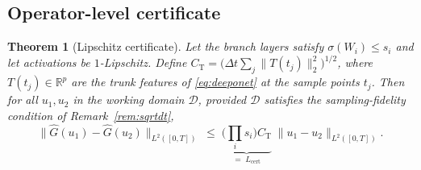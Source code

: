 \documentclass[11pt,sagev,times]{sagej}
\newtheorem{theorem}{Theorem}
\newcommand{\Ltwo}{L^2}
\newcommand{\Ghat}{\hat{G}}
\newcommand{\Lhat}{L_{\mathrm{cert}}}
\begin{document}
\subsection{Operator-level certificate}
\begin{theorem}[Lipschitz certificate]\label{thm:cert}
Let the branch layers satisfy $\sigma(W_i)\le s_i$ and let activations be
$1$-Lipschitz. Define
$C_{\mathrm{T}}=\big(\Delta t\sum_{j}\|T(t_j)\|_2^2\big)^{1/2}$, where
$T(t_j)\in\mathbb{R}^p$ are the trunk features of \eqref{eq:deeponet} at
the sample points $t_j$.
Then for all $u_1,u_2$ in the working domain $\mathcal{D}$, provided
$\mathcal{D}$ satisfies the sampling-fidelity condition of
Remark~\ref{rem:sqrtdt},
\begin{equation}
  \|\Ghat(u_1)-\Ghat(u_2)\|_{\Ltwo([0,T])}
  \;\le\; \underbrace{\Big(\prod_i s_i\Big) C_{\mathrm{T}}}_{=\;\Lhat}\;
  \|u_1-u_2\|_{\Ltwo([0,T])}.
\end{equation}
\end{theorem}
\end{document}
